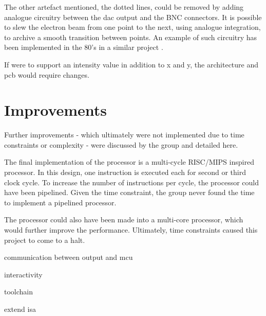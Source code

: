 The other artefact mentioned, the dotted lines, could be removed by adding analogue circuitry between the \gls{dac} output and the BNC connectors.
It is possible to slew the electron beam from one point to the next, using analogue integration, to archive a smooth transition between points.
An example of such circuitry has been implemented in the 80's in a similar project \cite{vector-graphic-crt}.

If \vthreek were to support an intensity value in addition to x and y, the architecture and \gls{pcb} would require changes.

\section{Improvements}
Further improvements - which ultimately were not implemented due to time constraints or complexity - were discussed by the group and detailed here.

The final implementation of the processor is a multi-cycle RISC/MIPS inspired processor.
In this design, one instruction is executed each for second or third clock cycle.
To increase the number of instructions per cycle, the processor could have been pipelined.
Given the time constraint, the group never found the time to implement a pipelined processor.

The processor could also have been made into a multi-core processor, which would further improve the performance. Ultimately, time constraints caused this project to come to a halt.

communication between output and mcu

interactivity

toolchain

extend isa
